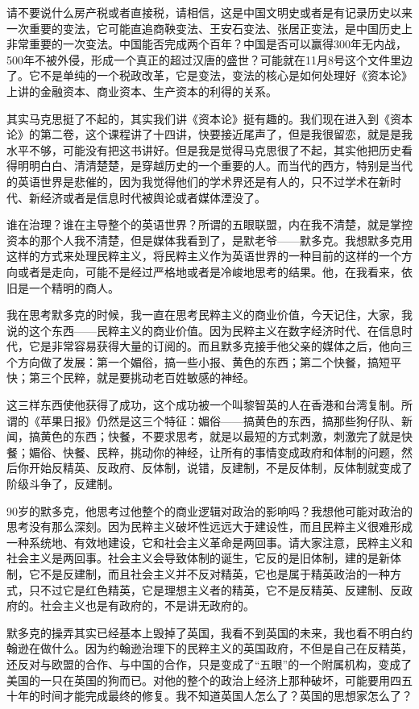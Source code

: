 \documentclass[UTF8, 12pt, a4paper]{ctexrep}
\begin{document}
请不要说什么房产税或者直接税，请相信，这是中国文明史或者是有记录历史以来一次重要的变法，它可能直追商鞅变法、王安石变法、张居正变法，是中国历史上非常重要的一次变法。中国能否完成两个百年？中国是否可以赢得300年无内战，500年不被外侵，形成一个真正的超过汉唐的盛世？可能就在11月8号这个文件里边了。它不是单纯的一个税政改革，它是变法，变法的核心是如何处理好《资本论》上讲的金融资本、商业资本、生产资本的利得的关系。

其实马克思挺了不起的，其实我们讲《资本论》挺有趣的。我们现在进入到《资本论》的第二卷，这个课程讲了十四讲，快要接近尾声了，但是我很留恋，就是是我水平不够，可能没有把这书讲好。但是我是觉得马克思很了不起，其实他把历史看得明明白白、清清楚楚，是穿越历史的一个重要的人。而当代的西方，特别是当代的英语世界是悲催的，因为我觉得他们的学术界还是有人的，只不过学术在新时代、新经济或者是信息时代被舆论或者媒体湮没了。

谁在治理？谁在主导整个的英语世界？所谓的五眼联盟，内在我不清楚，就是掌控资本的那个人我不清楚，但是媒体我看到了，是默老爷——默多克。我想默多克用这样的方式来处理民粹主义，将民粹主义作为英语世界的一种目前的这样的一个方向或者是走向，可能不是经过严格地或者是冷峻地思考的结果。他，在我看来，依旧是一个精明的商人。

我在思考默多克的时候，我一直在思考民粹主义的商业价值，今天记住，大家，我说的这个东西——民粹主义的商业价值。因为民粹主义在数字经济时代、在信息时代，它是非常容易获得大量的订阅的。而且默多克接手他父亲的媒体之后，他向三个方向做了发展：第一个媚俗，搞一些小报、黄色的东西；第二个快餐，搞短平快；第三个民粹，就是要挑动老百姓敏感的神经。

这三样东西使他获得了成功，这个成功被一个叫黎智英的人在香港和台湾复制。所谓的《苹果日报》仍然是这三个特征：媚俗——搞黄色的东西，搞那些狗仔队、新闻，搞黄色的东西；快餐，不要求思考，就是以最短的方式刺激，刺激完了就是快餐；媚俗、快餐、民粹，挑动你的神经，让所有的事情变成政府和体制的问题，然后你开始反精英、反政府、反体制，说错，反建制，不是反体制，反体制就变成了阶级斗争了，反建制。

90岁的默多克，他思考过他整个的商业逻辑对政治的影响吗？我想他可能对政治的思考没有那么深刻。因为民粹主义破坏性远远大于建设性，而且民粹主义很难形成一种系统地、有效地建设，它和社会主义革命是两回事。请大家注意，民粹主义和社会主义是两回事。社会主义会导致体制的诞生，它反的是旧体制，建的是新体制，它不是反建制，而且社会主义并不反对精英，它也是属于精英政治的一种方式，只不过它是红色精英，它是理想主义者的精英，它不是反精英、反建制、反政府的。社会主义也是有政府的，不是讲无政府的。

默多克的操弄其实已经基本上毁掉了英国，我看不到英国的未来，我也看不明白约翰逊在做什么。因为约翰逊治理下的民粹主义的英国政府，不但是自己在反精英，还反对与欧盟的合作、与中国的合作，只是变成了“五眼”的一个附属机构，变成了美国的一只在英国的狗而已。对他的整个的政治上经济上那种破坏，可能要用四五十年的时间才能完成最终的修复。我不知道英国人怎么了？英国的思想家怎么了？
\end{document}

